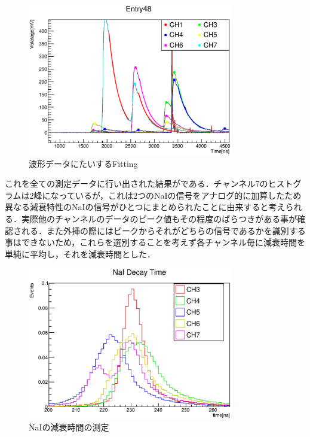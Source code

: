 \begin{figure}[bht]
  \centering
  \includegraphics[width=0.8\textwidth]{figure/hatano/decayfit.eps}
  \caption{波形データにたいするFitting}
  \label{hatano_fig:decayfit}
\end{figure}

これを全ての測定データに行い出された結果がである．チャンネル7のヒストグラムは2峰になっているが，これは2つのNaIの信号をアナログ的に加算したため異なる減衰特性のNaIの信号がひとつにまとめられたことに由来すると考えられる．実際他のチャンネルのデータのピーク値もその程度のばらつきがある事が確認される．また外挿の際にはピークからそれがどちらの信号であるかを識別する事はできないため，これらを選別することを考えず各チャンネル毎に減衰時間を単純に平均し，それを減衰時間とした．
\begin{figure}[bht]
  \centering
  \includegraphics[width=0.8\textwidth]{figure/hatano/decaytime.eps}
  \caption{NaIの減衰時間の測定}
  \label{hatano_fig:decaytime}
\end{figure}

